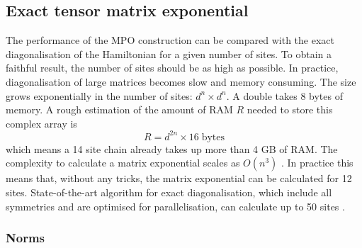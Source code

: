 
\subsection{Exact tensor matrix exponential } \label{chap_bench}

The performance of the \Gls{MPO} construction can be compared with the exact diagonalisation of the Hamiltonian for a given number of sites. To obtain a faithful result, the number of sites should be as high as possible. In practice, diagonalisation of large matrices becomes slow and memory consuming. The size grows exponentially in the number of sites: $d^{n} \times d^{n} $. A double takes 8 bytes of memory. A rough estimation of the amount of RAM $R$ needed to store this complex array is
\begin{equation}
  R = d^{2 n} \times 16 \; \text{bytes}
\end{equation}
which means a 14 site chain already takes up more than 4 GB of RAM. The complexity to calculate a matrix exponential scales as $O(n^3)$ \cite{Moler2003}. In practice this means that, without any tricks, the matrix exponential can be calculated for 12 sites.  State-of-the-art algorithm for exact diagonalisation, which include all symmetries and are optimised for parallelisation, can calculate up to 50 sites \cite{Wietek2018}.

\subsubsection{Norms} \label{mponormdef}

